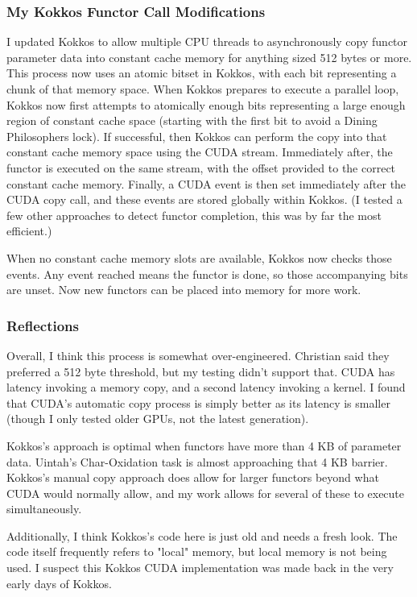\documentclass[]{article}
\begin{document}
\subsubsection{My Kokkos Functor Call Modifications}

I updated Kokkos to allow multiple CPU threads to asynchronously copy functor parameter data into constant cache memory for anything sized 512 bytes or more.  This process now uses an atomic bitset in Kokkos, with each bit representing a chunk of that memory space.  When Kokkos prepares to execute a parallel loop, Kokkos now first attempts to atomically enough bits representing a large enough region of constant cache space (starting with the first bit to avoid a Dining Philosophers lock).  If successful, then Kokkos can perform the copy into that constant cache memory space using the CUDA stream.  Immediately after, the functor is executed on the same stream, with the offset provided to the correct constant cache memory.  Finally, a CUDA event is then set immediately after the CUDA copy call, and these events are stored globally within Kokkos.  (I tested a few other approaches to detect functor completion, this was by far the most efficient.)

When no constant cache memory slots are available, Kokkos now checks those events.  Any event reached means the functor is done, so those accompanying bits are unset.  Now new functors can be placed into memory for more work.

\subsubsection{Reflections}

Overall, I think this process is somewhat over-engineered.  Christian said they preferred a 512 byte threshold, but my testing didn't support that.  CUDA has latency invoking a memory copy, and a second latency invoking a kernel.  I found that CUDA's automatic copy process is simply better as its latency is smaller (though I only tested older GPUs, not the latest generation).  

Kokkos's approach is optimal when functors have more than 4 KB of parameter data.  Uintah's Char-Oxidation task is almost approaching that 4 KB barrier.  Kokkos's manual copy approach does allow for larger functors beyond what CUDA would normally allow, and my work allows for several of these to execute simultaneously.

Additionally, I think Kokkos's code here is just old and needs a fresh look.  The code itself frequently refers to "local" memory, but local memory is not being used.  I suspect this Kokkos CUDA implementation was made back in the very early days of Kokkos.
\end{document}
